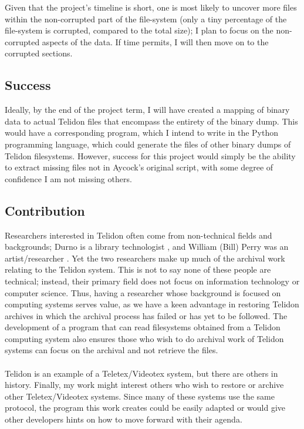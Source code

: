 \documentclass[sigconf]{acmart}
\begin{document}
Given that the project's timeline is short, one is most likely to uncover more files within the non-corrupted part of the file-system (only a tiny percentage of the file-system is corrupted, compared to the total size); I plan to focus on the non-corrupted aspects of the data. If time permits, I will then move on to the corrupted sections. 

\subsection{Success}

Ideally, by the end of the project term, I will have created a mapping of binary data to actual Telidon files that encompass the entirety of the binary dump. This would have a corresponding program, which I intend to write in the Python programming language, which could generate the files of other binary dumps of Telidon filesystems. However, success for this project would simply be the ability to extract missing files not in Aycock’s original script, with some degree of confidence I am not missing others.

\subsection{Contribution}

Researchers interested in Telidon often come from non-technical fields and backgrounds; Durno is a library technologist \cite{durno_2022}, and William (Bill) Perry was an artist/researcher \cite{perry}. Yet the two researchers make up much of the archival work relating to the Telidon system. This is not to say none of these people are technical; instead, their primary field does not focus on information technology or computer science. Thus, having a researcher whose background is focused on computing systems serves value, as we have a keen advantage in restoring Telidon archives in which the archival process has failed or has yet to be followed. The development of a program that can read filesystems obtained from a Telidon computing system also ensures those who wish to do archival work of Telidon systems can focus on the archival and not retrieve the files. \\ \\ 

Telidon is an example of a Teletex/Videotex system, but there are others in history. Finally, my work might interest others who wish to restore or archive other Teletex/Videotex systems. Since many of these systems use the same protocol, the program this work creates could be easily adapted or would give other developers hints on how to move forward with their agenda.
\end{document}
